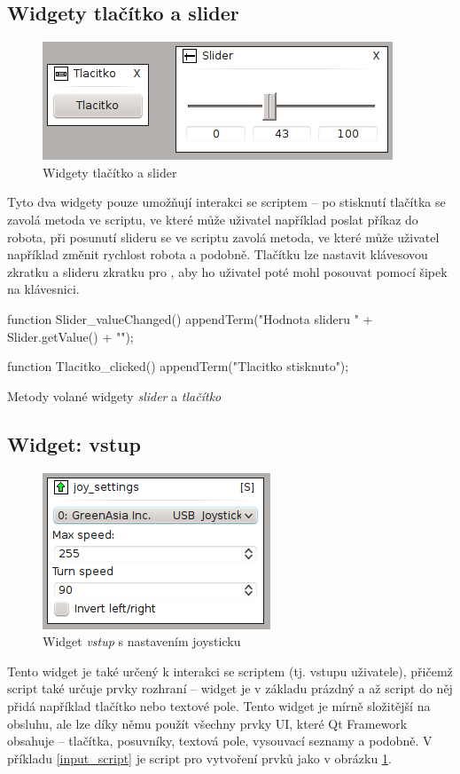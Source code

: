\documentclass[12pt, a4paper, oneside]{article}
\newcommand{\It}{\textit}  %
\begin{document}
\subsection{Widgety tlačítko a slider}
\begin{figure}[H]
\begin{center}
\includegraphics[scale=1]{img/w_btn_slider.png}
\caption{Widgety tlačítko a slider}
\end{center}
\end{figure}
Tyto dva widgety pouze umožňují interakci se scriptem -- po stisknutí tlačítka se zavolá metoda ve scriptu, ve které může uživatel například poslat příkaz do robota, při posunutí slideru se ve scriptu zavolá metoda, ve které může uživatel například změnit rychlost robota a podobně. Tlačítku lze nastavit klávesovou zkratku a slideru zkratku pro , aby ho uživatel poté mohl posouvat pomocí šipek na klávesnici.
\begin{listing}[H]
\begin{jscode}
function Slider_valueChanged() {
    appendTerm("Hodnota slideru " + Slider.getValue() + "\n");
}

function Tlacitko_clicked() {
    appendTerm("Tlacitko stisknuto\n");
}
\end{jscode}
\caption{Metody volané widgety \It{slider} a \It{tlačítko}}
\end{listing}

\subsection{Widget: vstup}
\begin{figure}[H]
\begin{center}
\includegraphics[scale=1]{img/w_input.png}
\caption{Widget \It{vstup} s nastavením joysticku}
\label{input}
\end{center}
\end{figure}
Tento widget je také určený k interakci se scriptem (tj. vstupu uživatele), přičemž script také určuje prvky rozhraní -- widget je v základu prázdný a až script do něj přidá například tlačítko nebo textové pole. Tento widget je mírně složitější na obsluhu, ale lze díky němu použít všechny prvky UI, které Qt Framework obsahuje -- tlačítka, posuvníky, textová pole, vysouvací seznamy a podobně. V příkladu \ref{input_script} je script pro vytvoření prvků jako v obrázku \ref{input}.
\end{document}

